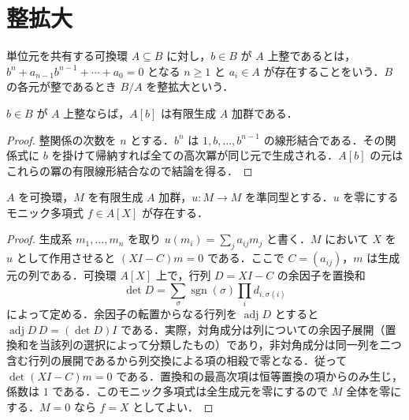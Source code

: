 \section{整拡大}
\begin{defn}[整元と整拡大]
単位元を共有する可換環 $A\subseteq B$ に対し，$b\in B$ が $A$ 上整であるとは，$b^n+a_{n-1}b^{n-1}+\cdots+a_0=0$ となる $n\geq1$ と $a_i\in A$ が存在することをいう．$B$ の各元が整であるとき $B/A$ を整拡大という．
\end{defn}
\begin{prop}[単元添加の有限性]
$b\in B$ が $A$ 上整ならば，$A[b]$ は有限生成 $A$ 加群である．
\end{prop}
\begin{proof}
整関係の次数を $n$ とする．$b^n$ は $1,b,\ldots,b^{n-1}$ の線形結合である．その関係式に $b$ を掛けて帰納すれば全ての高次冪が同じ元で生成される．$A[b]$ の元はこれらの冪の有限線形結合なので結論を得る．
\end{proof}
\begin{prop}[行列式技巧]
$A$ を可換環，$M$ を有限生成 $A$ 加群，$u:M\to M$ を準同型とする．$u$ を零にするモニック多項式 $f\in A[X]$ が存在する．
\end{prop}
\begin{proof}
生成系 $m_1,\ldots,m_n$ を取り $u(m_i)=\sum_j a_{ij}m_j$ と書く．$M$ において $X$ を $u$ として作用させると $(XI-C)m=0$ である．ここで $C=(a_{ij})$，$m$ は生成元の列である．可換環 $A[X]$ 上で，行列 $D=XI-C$ の余因子を置換和
\[
\det D=\sum_{\sigma}\operatorname{sgn}(\sigma)\prod_i d_{i,\sigma(i)}
\]
によって定める．余因子の転置からなる行列を $\operatorname{adj}D$ とすると $\operatorname{adj}D\,D=(\det D)I$ である．実際，対角成分は列についての余因子展開（置換和を当該列の選択によって分類したもの）であり，非対角成分は同一列を二つ含む行列の展開であるから列交換による項の相殺で零となる．従って $\det(XI-C)m=0$ である．置換和の最高次項は恒等置換の項からのみ生じ，係数は $1$ である．このモニック多項式は全生成元を零にするので $M$ 全体を零にする．$M=0$ なら $f=X$ としてよい．
\end{proof}
